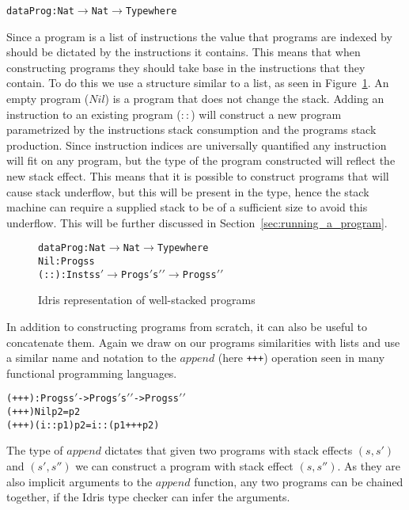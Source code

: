 \begin{alltt}
data Prog : Nat \(\rightarrow\)  Nat \(\rightarrow\)  Type where
\end{alltt}

Since a program is a list of instructions the value that programs are indexed by should be dictated by the instructions it contains. This means that when constructing programs they should take base in the instructions that they contain. To do this we use a structure similar to a list, as seen in Figure~\ref{fig:idris_impl_of_prg}. An empty program ($Nil$) is a program that does not change the stack. Adding an instruction to an existing program ($::$) will construct a new program parametrized by the instructions stack consumption and the programs stack production. Since instruction indices are universally quantified any instruction will fit on any program, but the type of the program constructed will reflect the new stack effect. This means that it is possible to construct programs that will cause stack underflow, but this will be present in the type, hence the stack machine can require a supplied stack to be of a sufficient size to avoid this underflow. This will be further discussed in Section~\ref{sec:running_a_program}.

\begin{figure}
\begin{alltt}
data Prog : Nat \(\rightarrow\)  Nat \(\rightarrow\)  Type where
  Nil  : Prog s s
  (::) : Inst s s\('\) \(\rightarrow\)  Prog s\('\) s\('\)\('\) \(\rightarrow\)  Prog s s\('\)\('\)
\end{alltt}
\caption{Idris representation of well-stacked programs}
\label{fig:idris_impl_of_prg}
\end{figure}

In addition to constructing programs from scratch, it can also be useful to concatenate them. Again we draw on our programs similarities with lists and use a similar name and notation to the $append$ (here \texttt{+++}) operation seen in many functional programming languages.

\begin{alltt}
(+++) : Prog s s\('\) -> Prog s\('\) s\('\)\('\) -> Prog s s\('\)\('\)
(+++) Nil p2       = p2
(+++) (i :: p1) p2 = i :: (p1 +++ p2)
\end{alltt}

The type of $append$ dictates that given two programs with stack effects $(s, s')$ and $(s', s'')$ we can construct a program with stack effect $(s, s'')$. As they are also implicit arguments to the $append$ function, any two programs can be chained together, if the Idris type checker can infer the arguments.